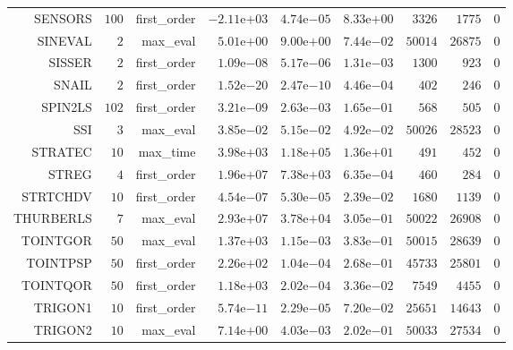 \begin{longtable}{rrrrrrrrr}
SENSORS & \(   100\) & first\_order & \(-2.11\)e\(+03\) & \( 4.74\)e\(-05\) & \( 8.33\)e\(+00\) & \(  3326\) & \(  1775\) & \(     0\) \\
SINEVAL & \(     2\) & max\_eval & \( 5.01\)e\(+00\) & \( 9.00\)e\(+00\) & \( 7.44\)e\(-02\) & \( 50014\) & \( 26875\) & \(     0\) \\
SISSER & \(     2\) & first\_order & \( 1.09\)e\(-08\) & \( 5.17\)e\(-06\) & \( 1.31\)e\(-03\) & \(  1300\) & \(   923\) & \(     0\) \\
SNAIL & \(     2\) & first\_order & \( 1.52\)e\(-20\) & \( 2.47\)e\(-10\) & \( 4.46\)e\(-04\) & \(   402\) & \(   246\) & \(     0\) \\
SPIN2LS & \(   102\) & first\_order & \( 3.21\)e\(-09\) & \( 2.63\)e\(-03\) & \( 1.65\)e\(-01\) & \(   568\) & \(   505\) & \(     0\) \\
SSI & \(     3\) & max\_eval & \( 3.85\)e\(-02\) & \( 5.15\)e\(-02\) & \( 4.92\)e\(-02\) & \( 50026\) & \( 28523\) & \(     0\) \\
STRATEC & \(    10\) & max\_time & \( 3.98\)e\(+03\) & \( 1.18\)e\(+05\) & \( 1.36\)e\(+01\) & \(   491\) & \(   452\) & \(     0\) \\
STREG & \(     4\) & first\_order & \( 1.96\)e\(+07\) & \( 7.38\)e\(+03\) & \( 6.35\)e\(-04\) & \(   460\) & \(   284\) & \(     0\) \\
STRTCHDV & \(    10\) & first\_order & \( 4.54\)e\(-07\) & \( 5.30\)e\(-05\) & \( 2.39\)e\(-02\) & \(  1680\) & \(  1139\) & \(     0\) \\
THURBERLS & \(     7\) & max\_eval & \( 2.93\)e\(+07\) & \( 3.78\)e\(+04\) & \( 3.05\)e\(-01\) & \( 50022\) & \( 26908\) & \(     0\) \\
TOINTGOR & \(    50\) & max\_eval & \( 1.37\)e\(+03\) & \( 1.15\)e\(-03\) & \( 3.83\)e\(-01\) & \( 50015\) & \( 28639\) & \(     0\) \\
TOINTPSP & \(    50\) & first\_order & \( 2.26\)e\(+02\) & \( 1.04\)e\(-04\) & \( 2.68\)e\(-01\) & \( 45733\) & \( 25801\) & \(     0\) \\
TOINTQOR & \(    50\) & first\_order & \( 1.18\)e\(+03\) & \( 2.02\)e\(-04\) & \( 3.36\)e\(-02\) & \(  7549\) & \(  4455\) & \(     0\) \\
TRIGON1 & \(    10\) & first\_order & \( 5.74\)e\(-11\) & \( 2.29\)e\(-05\) & \( 7.20\)e\(-02\) & \( 25651\) & \( 14643\) & \(     0\) \\
TRIGON2 & \(    10\) & max\_eval & \( 7.14\)e\(+00\) & \( 4.03\)e\(-03\) & \( 2.02\)e\(-01\) & \( 50033\) & \( 27534\) & \(     0\) \\

\end{longtable}
